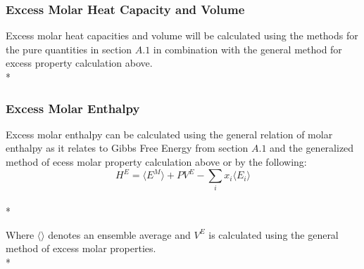 \documentclass[a4paper,12pt]{article}
\begin{document}
\subsubsection{Excess Molar Heat Capacity and Volume}
 Excess molar heat capacities and volume will be calculated using the  methods for the pure quantities in section $A.1$ in combination with the general method for excess property calculation above.\\*

\subsubsection{Excess Molar Enthalpy}
 Excess molar enthalpy can be calculated using the general relation of molar enthalpy as it relates to Gibbs Free Energy from section $A.1$ and the generalized method of ecess molar property calculation above or by the following\cite{hexcess}:
\begin{equation}H^E = \langle E^M \rangle + P V^E - \sum_{i} x_i \langle E_i \rangle\end{equation}\\*

 Where $\langle \rangle$ denotes an ensemble average and $V^E$ is calculated using the general method of excess molar properties.\\* 




\end{document}
